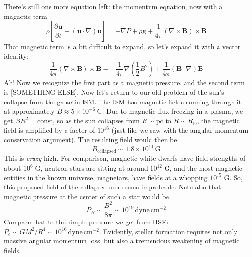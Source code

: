 \documentclass[10pt]{article}
\numberwithin{equation}{section}
\newcommand{\n}{\noindent}
\begin{document}
    \n There's still one more equation left: the momentum equation, now with a
    magnetic term
    \begin{equation}
      \label{eq:momentum} \rho\left[\frac{\partial \mathbf{u}}{\partial t} +
      (\mathbf{u}\cdot\nabla)\mathbf{u}\right] = -\nabla P + \rho \mathbf{g} +
      \frac{1}{4\pi}\left(\nabla\times \mathbf{B}\right)\times \mathbf{B}
    \end{equation}
    That magnetic term is a bit difficult to expand, so let's expand it with a
    vector identity:
    \begin{equation}
      \label{eq:momentum2} \frac{1}{4\pi}\left(\nabla\times \mathbf{B}\right)
      \times \mathbf{B} = -\frac{1}{4\pi}\nabla\left(\frac{1}{2}B^2\right) +
      \frac{1}{4\pi} \left(\mathbf{B}\cdot \nabla\right)\mathbf{B}
    \end{equation}
    Ah! Now we recognize the first part as a magnetic pressure, and the second
    term is [SOMETHING ELSE]. Now let's return to our old problem of the sun's
    collapse from the galactic ISM. The ISM has magnetic fields running through
    it at approximately $B\approx 5\times 10^{-6}\ \mathrm{G}$. Due to magnetic
    flux freezing in a plasma, we get $BR^2 = \mathrm{const}$, so as the sun
    collapses from $R\sim \mathrm{pc}$ to $R\sim R_\odot$, the magnetic field
    is amplified by a factor of $10^{16}$ (just like we saw with the angular
    momentum conservation argument). The resulting field would then be
    \begin{equation}
      B_{\mathrm{collapsed}} \sim 1.8\times 10^{10}\ \mathrm{G}
    \end{equation}
    This is \emph{crazy} high. For comparison, magnetic white dwarfs have field
    strengths of about $10^6$ G, neutron stars are sitting at around $10^{12}$
    G, and the most magnetic entities in the known universe, magnetars, have
    fields at a whopping $10^{15}$ G. So, this proposed field of the collapsed
    sun seems improbable. Note also that magnetic pressure at the center of
    such a star would be
    \begin{equation}
      \label{eq:mag_pressure} P_B\sim\frac{B^2}{8\pi}\sim 10^{19}\
      \mathrm{dyne\ cm^{-2}}
    \end{equation}
    Compare that to the simple pressure we get from HSE: $P_c\sim GM^2/R^4 \sim
    10^{16}\ \mathrm{dyne\ cm^{-2}}$. Evidently, stellar formation requires not
    only massive angular momentum loss, but also a tremendous weakening of
    magnetic fields.
  
	
\end{document}

